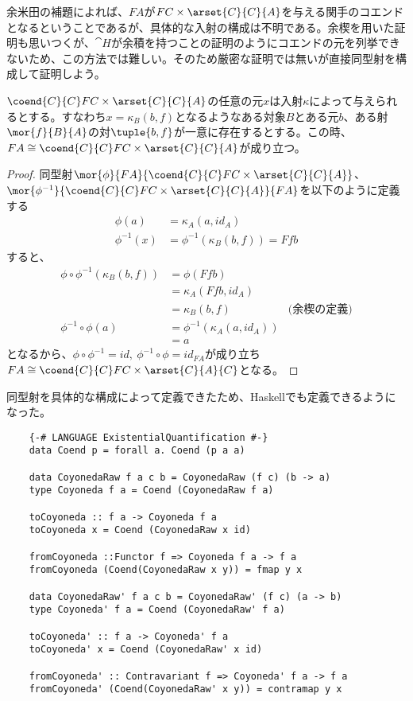 \documentclass[uplatex,dvipdfmx]{jsarticle}
\begin{document}
  余米田の補題によれば、$FA$が$FC\times\arset{C}{C}{A}$を与える関手のコエンドとなるということであるが、具体的な入射の構成は不明である。余楔を用いた証明も思いつくが、$\cat{H}$が余積を持つことの証明のようにコエンドの元を列挙できないため、この方法では難しい。そのため厳密な証明では無いが直接同型射を構成して証明しよう。
  \begin{prop}
    $\coend{C}{C} FC\times\arset{C}{C}{A}$の任意の元$x$は入射$\kappa$によって与えられるとする。すなわち$x = \kappa_B(b,f)$となるようなある対象$B$とある元$b$、ある射$\mor{f}{B}{A}$の対$\tuple{b,f}$が一意に存在するとする。この時、$FA\cong\coend{C}{C} FC\times\arset{C}{C}{A}$が成り立つ。
  \end{prop}
  \begin{proof}
    同型射$\mor{\phi}{FA}{\coend{C}{C} FC\times\arset{C}{C}{A}}$、$\mor{\phi^{-1}}{\coend{C}{C} FC\times\arset{C}{C}{A}}{FA}$を以下のように定義する
    \begin{align*}
      \phi(a) &= \kappa_A(a,id_A)\\
      \phi^{-1}(x) &= \phi^{-1}(\kappa_B(b,f)) = Ffb
    \end{align*}
    すると、
    \begin{align*}
      \phi\circ\phi^{-1}(\kappa_B(b,f))&=\phi(Ffb)\\
      &=\kappa_A(Ffb,id_A)\\
      &=\kappa_B(b,f)&\text{(余楔の定義)}\\
      \phi^{-1}\circ\phi(a) &= \phi^{-1}(\kappa_A(a,id_A))\\
      &=a
    \end{align*}
    となるから、$\phi\circ\phi^{-1}=id,\ \phi^{-1}\circ\phi=id_{FA}$が成り立ち$FA\cong\coend{C}{C}FC\times \arset{C}{A}{C}$となる。
  \end{proof}

  同型射を具体的な構成によって定義できたため、Haskellでも定義できるようになった。
  \begin{lstlisting}
    {-# LANGUAGE ExistentialQuantification #-}
    data Coend p = forall a. Coend (p a a)

    data CoyonedaRaw f a c b = CoyonedaRaw (f c) (b -> a)
    type Coyoneda f a = Coend (CoyonedaRaw f a)

    toCoyoneda :: f a -> Coyoneda f a
    toCoyoneda x = Coend (CoyonedaRaw x id)

    fromCoyoneda ::Functor f => Coyoneda f a -> f a
    fromCoyoneda (Coend(CoyonedaRaw x y)) = fmap y x

    data CoyonedaRaw' f a c b = CoyonedaRaw' (f c) (a -> b)
    type Coyoneda' f a = Coend (CoyonedaRaw' f a)

    toCoyoneda' :: f a -> Coyoneda' f a
    toCoyoneda' x = Coend (CoyonedaRaw' x id)

    fromCoyoneda' :: Contravariant f => Coyoneda' f a -> f a
    fromCoyoneda' (Coend(CoyonedaRaw' x y)) = contramap y x
  \end{lstlisting}
\end{document}
